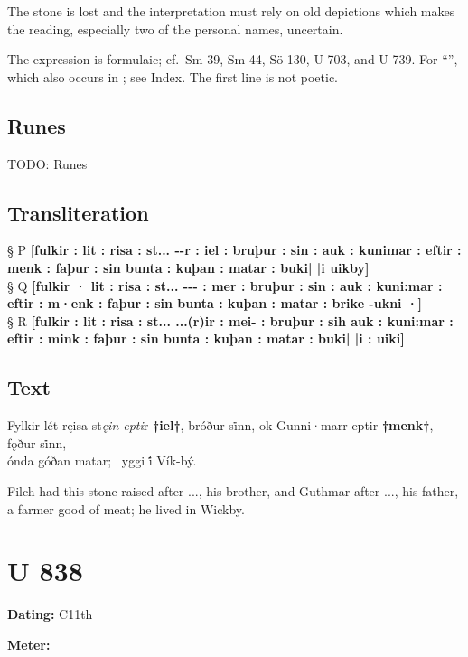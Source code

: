 The stone is lost and the interpretation must rely on old depictions which makes the reading, especially two of the personal names, uncertain.

The expression is formulaic; cf.~Sm 39, Sm 44, Sö 130, U 703, and U 739.  For “”, which also occurs in ; see Index.  The first line is not poetic.

\subsection{Runes}

TODO: Runes%

\subsection{Transliteration}

§ P \textbf{[fulkir : lit : risa : st... -{}-r : iel : bruþur : sin : auk : kunimar : eftir : menk : faþur : sin bunta : kuþan : matar : buki| |i uikby]} \\
§ Q \textbf{[fulkir · lit : risa : st... -{}-{}- : mer : bruþur : sin : auk : kuni:mar : eftir : m·enk : faþur : sin bunta : kuþan : matar : brike -ukni ·]} \\
§ R \textbf{[fulkir : lit : risa : st... ...(r)ir : mei- : bruþur : sih auk : kuni:mar : eftir : mink : faþur : sin bunta : kuþan : matar : buki| |i : uiki]}

\subsection{Text}

\bpg\bpa[0]%
\startsub Fylkir lét ręisa st\emph{ęin epti}r \textbf{†iel†}, bróður si̇nn, ok Gunni·marr eptir \textbf{†menk†}, fǫður si̇nn,\endsub \\
ónda góðan matar; \hld\ yggi i̇́ Vík-bý.\epa

\bpb Filch had this stone raised after ..., his brother, and Guthmar after ..., his father, \\
a farmer good of meat; he lived in Wickby.\epb\epg

\sectionline\clearpage


\section{U 838}

\begin{flushright}%
\textbf{Dating:} C11th

\textbf{Meter:} \Fornyrdislag
\end{flushright}%

